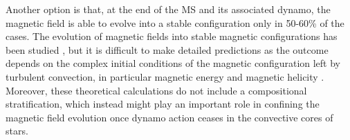 Another option is that, at the end of the MS and its associated dynamo, the magnetic field is able to evolve into a stable configuration only in 50-60\% of the cases. The evolution of magnetic fields into stable magnetic configurations has been studied \citep{Braithwaite_2006}, but it is difficult to make detailed predictions as the outcome depends on the complex initial conditions of the magnetic configuration left by turbulent convection, in particular magnetic energy and magnetic helicity \citep{Braithwaite_2008}. Moreover, these theoretical calculations do not include a compositional stratification, which instead might play an important role in confining the magnetic field evolution once dynamo action ceases in the convective cores of stars. 